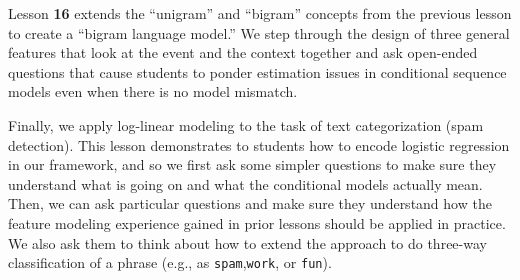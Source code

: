\documentclass[11pt,letterpaper]{article}
\begin{document}
Lesson \textbf{16} extends the ``unigram'' and ``bigram'' concepts from the previous lesson to create a ``bigram 
language model.'' We step through the design of three general features that look at the event and the context 
together and ask open-ended questions that cause students to ponder estimation issues in conditional sequence 
models even when there is no model mismatch.%


Finally, we apply log-linear modeling to the task of text categorization (spam detection). This lesson demonstrates to students how to encode logistic regression in our framework, and so 
we first ask some simpler questions to make sure they understand what is going on and what the conditional models actually mean.
Then, we can ask particular questions and make sure they understand how the feature modeling experience gained in 
prior lessons should be applied in practice. We also ask them to think about how to extend the approach to do three-way classification 
of a phrase (e.g., as \texttt{spam},\texttt{work}, or \texttt{fun}).
\end{document}
